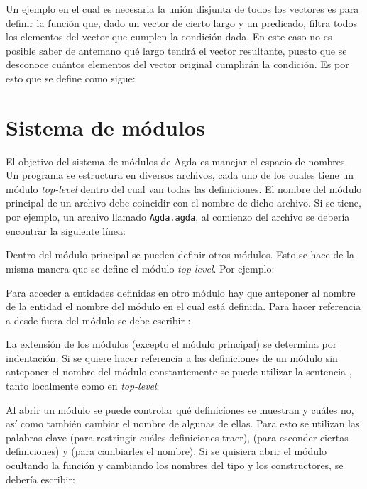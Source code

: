 Un ejemplo en el cual es necesaria la unión disjunta de todos los vectores es para definir la función  que, dado un vector de cierto largo  y un predicado, filtra todos los elementos del vector que cumplen la condición dada. En este caso no es posible saber de antemano qué largo tendrá el vector resultante, puesto que se desconoce cuántos elementos del vector original cumplirán la condición. Es por esto que se define como sigue:


\section{Sistema de módulos}\label{agda:modules}

El objetivo del sistema de módulos de Agda es manejar el espacio de nombres. Un programa se estructura en diversos archivos, cada uno de los cuales tiene un módulo \textit{top-level} dentro del cual van todas las definiciones. El nombre del módulo principal de un archivo debe coincidir con el nombre de dicho archivo. Si se tiene, por ejemplo, un archivo llamado \texttt{Agda.agda}, al comienzo del archivo se debería encontrar la siguiente línea:


Dentro del módulo principal se pueden definir otros módulos. Esto se hace de la misma manera que se define el módulo \textit{top-level}. Por ejemplo:


Para acceder a entidades definidas en otro módulo hay que anteponer al nombre de la entidad el nombre del módulo en el cual está definida. Para hacer referencia a  desde fuera del módulo  se debe escribir :




La extensión de los módulos (excepto el módulo principal) se determina por indentación. Si se quiere hacer referencia a las definiciones de un módulo sin anteponer el nombre del módulo constantemente se puede utilizar la sentencia , tanto localmente como en \textit{top-level}:






Al abrir un módulo se puede controlar qué definiciones se muestran y cuáles no, así como también cambiar el nombre de algunas de ellas. Para esto se utilizan las palabras clave  (para restringir cuáles definiciones traer),  (para esconder ciertas definiciones) y  (para cambiarles el nombre). Si se quisiera abrir el módulo  ocultando la función  y cambiando los nombres del tipo y los constructores, se debería escribir:

